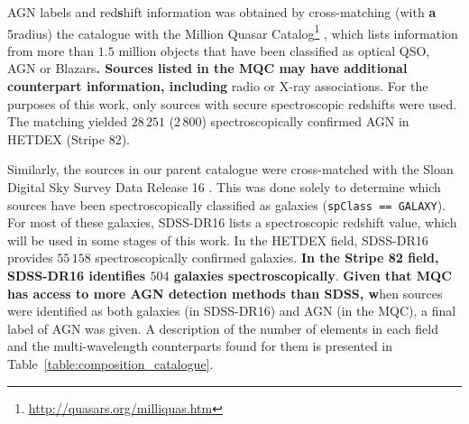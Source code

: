 \documentclass{aa}
\begin{document}
AGN labels and red\textbf{s}hift information was obtained by cross-matching (with \textbf{a} 5\arcsec radius) the catalogue with the Million Quasar Catalog\footnote{\url{http://quasars.org/milliquas.htm}} \citep[MQC, v7.4d;][]{2021arXiv210512985F}, which lists information from more than $1.5$ million objects that have been classified as optical QSO, AGN or Blazars\textbf{. Sources listed in the MQC may have additional counterpart information, including} radio or X-ray associations. 
For the purposes of this work, only sources with secure spectroscopic redshifts were used. The matching yielded $28\,251$ ($2\,800$) spectroscopically confirmed AGN in HETDEX (Stripe 82). 

Similarly, the sources in our parent catalogue were cross-matched
with the Sloan Digital Sky Survey Data Release 16 \citep[SDSS-DR16;][]{2020ApJS..249....3A}. This was done solely to determine which sources have been spectroscopically classified as galaxies (\verb|spClass == GALAXY|). 
For most of these galaxies, SDSS-DR16 lists a spectroscopic redshift value, which will be used in some stages of this work. In the HETDEX field,
SDSS-DR16 provides $55\,158$ spectroscopically confirmed galaxies. \textbf{In the Stripe 82 field, SDSS-DR16 identifies $504$ galaxies spectroscopically}. \textbf{Given that MQC has access to more AGN detection methods than SDSS, w}hen sources were identified as both galaxies (in SDSS-DR16) and AGN (in the MQC), a final label of AGN was given. 
A description of the number of elements in each field and the multi-wavelength counterparts found for them is presented in Table~\ref{table:composition_catalogue}.
\end{document}
